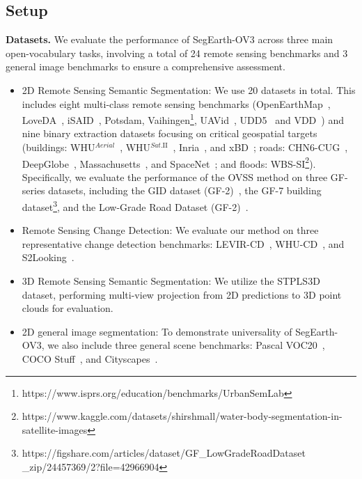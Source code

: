 \documentclass[twocolumn,switch,times]{article}
\newcommand{\samov}{SegEarth-OV\textcolor{cvprpink}{3}\xspace}
\begin{document}
\subsection{Setup}

\textbf{Datasets.} We evaluate the performance of \samov across three main open-vocabulary tasks, involving a total of 24 remote sensing benchmarks and 3 general image benchmarks to ensure a comprehensive assessment.

\begin{itemize}
    \item 2D Remote Sensing Semantic Segmentation: We use 20 datasets in total. This includes eight multi-class remote sensing benchmarks (OpenEarthMap~\citep{xia2023openearthmap}, LoveDA~\citep{loveda}, iSAID~\citep{waqas2019isaid}, Potsdam, Vaihingen\footnote{https://www.isprs.org/education/benchmarks/UrbanSemLab}, UAVid~\citep{LYU2020108}, UDD5~\citep{chen2018large} and VDD~\citep{cai2023vdd}) and nine binary extraction datasets focusing on critical geospatial targets (buildings: WHU$^{Aerial}$~\citep{ji2018fully}, WHU$^{Sat.\mathrm{II}}$~\citep{ji2018fully}, Inria~\citep{maggiori2017can}, and xBD~\citep{gupta2019xbddatasetassessingbuilding}; roads: CHN6-CUG~\citep{zhu2021global}, DeepGlobe~\citep{demir2018deepglobe}, Massachusetts~\citep{MnihThesis}, and SpaceNet~\citep{van2018spacenet}; and floods: WBS-SI\footnote{https://www.kaggle.com/datasets/shirshmall/water-body-segmentation-in-satellite-images}). Specifically, we evaluate the performance of the OVSS method on three GF-series datasets, including the GID dataset (GF-2)~\citep{tong2020land}, the GF-7 building dataset\footnote{https://figshare.com/articles/dataset/GF\_LowGradeRoadDataset \_zip/24457369/2?file=42966904}, and the Low-Grade Road Dataset (GF-2)~\citep{chen2023leveraging}.

    \item Remote Sensing Change Detection: We evaluate our method on three representative change detection benchmarks: LEVIR-CD~\citep{chen2020spatial}, WHU-CD~\citep{ji2018fully}, and S2Looking~\citep{shen2021s2looking}.

    \item 3D Remote Sensing Semantic Segmentation: We utilize the STPLS3D~\citep{chen2022stpls3d} dataset, performing multi-view projection from 2D predictions to 3D point clouds for evaluation.

    \item 2D general image segmentation: To demonstrate universality of \samov, we also include three general scene benchmarks: Pascal VOC20~\citep{everingham2010pascal}, COCO Stuff~\citep{caesar2018coco}, and Cityscapes~\citep{cordts2016cityscapes}.

\end{itemize}
\end{document}
